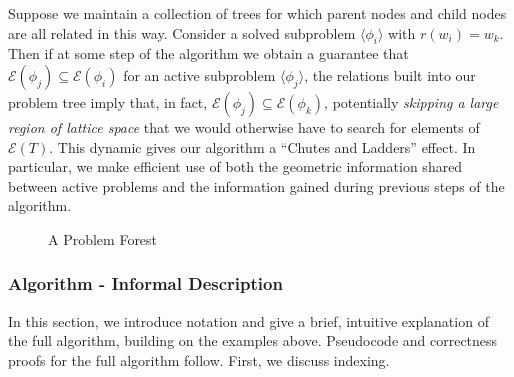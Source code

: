 \documentclass[11pt,reqno]{amsart}
\theoremstyle{definition}
\numberwithin{equation}{section}
\newcommand{\lag}{\langle}
\newcommand{\rag}{\rangle}
\newcommand{\pre}{\phi}
\newcommand{\sub}{\subseteq}
\newcommand{\fix}{\mathcal{E}}
\begin{document}
Suppose we maintain a collection of trees for which parent nodes and child nodes are all related in this way. 
Consider a solved subproblem $\lag \pre_i \rag$ with $r(w_i) = w_k$.
Then if at some step of the algorithm we obtain a guarantee that $\fix(\pre_j) \sub \fix(\pre_i)$ for an active subproblem $\lag \pre_j \rag$, the relations built into our problem tree imply that, in fact, $\fix(\pre_j) \sub \fix(\pre_k)$, potentially \emph{skipping a large region of lattice space} that we would otherwise have to search for elements of $\fix(T)$. 
This dynamic gives our algorithm a ``Chutes and Ladders'' effect. 
In particular, we make efficient use of both the geometric information shared between active problems and the information gained during previous steps of the algorithm. 

\begin{figure} \label{fig:forest} 
\caption{A Problem Forest}
\end{figure}

\subsubsection{Algorithm - Informal Description} 

In this section, we introduce notation and give a brief, intuitive explanation of the full algorithm, building on the examples above.
Pseudocode and correctness proofs for the full algorithm follow. 
First, we discuss indexing. 
\end{document}
